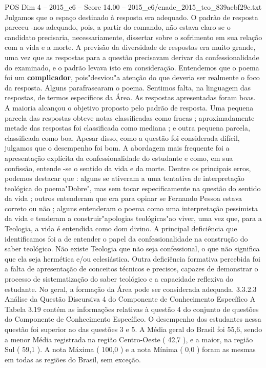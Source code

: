 \begin{textsample}{POS Dim 4 – 2015\_c6 – Score 14.00 – 2015\_c6/enade\_2015\_teo\_839aebf29e.txt}
Julgamos que o espaço destinado à resposta era adequado.
O padrão de resposta pareceu -nos adequado, pois, a partir do comando, não estava claro se o candidato precisaria, necessariamente, dissertar sobre o sofrimento em sua relação com a vida e a morte.
A previsão da diversidade de respostas era muito grande, uma vez que as respostas para a questão precisavam derivar da confessionalidade do examinado, e o padrão levava isto em consideração.
Entendemos que o poema foi um \textbf{complicador}, pois"desviou"a atenção do que deveria ser realmente o foco da resposta.
Alguns parafrasearam o poema.
Sentimos falta, na linguagem das respostas, de termos específicos da Área.
As respostas apresentadas foram boas.
A maioria alcançou o objetivo proposto pelo padrão de resposta.
Uma pequena parcela das respostas obteve notas classificadas como fracas ; aproximadamente metade das respostas foi classificada como mediana ; e outra pequena parcela, classificada como boa.
Apesar disso, como a questão foi considerada difícil, julgamos que o desempenho foi bom.
A abordagem mais frequente foi a apresentação explícita da confessionalidade do estudante e como, em sua confissão, entende -se o sentido da vida e da morte.
Dentre os principais erros, podemos destacar que : alguns se ativeram a uma tentativa de interpretação teológica do poema"Dobre", mas sem tocar especificamente na questão do sentido da vida ; outros entenderam que era para opinar se Fernando Pessoa estava correto ou não ; alguns entenderam o poema como uma interpretação pessimista da vida e tenderam a construir"apologias teológicas"ao viver, uma vez que, para a Teologia, a vida é entendida como dom divino.
A principal deficiência que identificamos foi a de entender o papel da confessionalidade na construção do saber teológico.
Não existe Teologia que não seja confessional, o que não significa que ela seja hermética e/ou eclesiástica.
Outra deficiência formativa percebida foi a falta de apresentação de conceitos técnicos e precisos, capazes de demonstrar o processo de sistematização do saber teológico e a capacidade reflexiva do estudante.
No geral, a formação da Área pode ser considerada adequada. 3.3.2.3 Análise da Questão Discursiva 4 do Componente de Conhecimento Específico A Tabela 3.19 contém as informações relativas à questão 4 do conjunto de questões do Componente de Conhecimento Específico.
O desempenho dos estudantes nessa questão foi superior ao das questões 3 e 5.
A Média geral do Brasil foi 55,6, sendo a menor Média registrada na região Centro-Oeste ( 42,7 ), e a maior, na região Sul ( 59,1 ).
A nota Máxima ( 100,0 ) e a nota Mínima ( 0,0 ) foram as mesmas em todas as regiões do Brasil, sem exceção.

\end{textsample}
